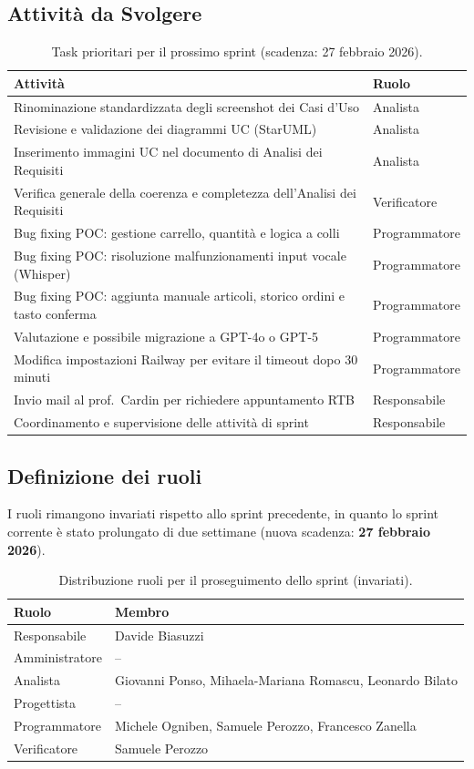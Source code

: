 \documentclass[a4paper, 11pt, oneside]{scrartcl}
\begin{document}
\subsection{Attività da Svolgere}
\begin{table}[h!]
\centering
\begin{tabular}{@{}p{9.2cm}l@{}}
\toprule
\textbf{Attività} & \textbf{Ruolo} \\
\midrule
Rinominazione standardizzata degli screenshot dei Casi d'Uso & Analista \\
Revisione e validazione dei diagrammi UC (StarUML) & Analista \\
Inserimento immagini UC nel documento di Analisi dei Requisiti & Analista \\
Verifica generale della coerenza e completezza dell'Analisi dei Requisiti & Verificatore \\
Bug fixing POC: gestione carrello, quantità e logica a colli & Programmatore \\
Bug fixing POC: risoluzione malfunzionamenti input vocale (Whisper) & Programmatore \\
Bug fixing POC: aggiunta manuale articoli, storico ordini e tasto conferma & Programmatore \\
Valutazione e possibile migrazione a GPT-4o o GPT-5 & Programmatore \\
Modifica impostazioni Railway per evitare il timeout dopo 30 minuti & Programmatore \\
Invio mail al prof.\ Cardin per richiedere appuntamento RTB & Responsabile \\
Coordinamento e supervisione delle attività di sprint & Responsabile \\
\bottomrule
\end{tabular}
\caption{Task prioritari per il prossimo sprint (scadenza: 27 febbraio 2026).}
\end{table}

\subsection{Definizione dei ruoli}
I ruoli rimangono invariati rispetto allo sprint precedente, in quanto lo sprint corrente è stato prolungato di due settimane (nuova scadenza: \textbf{27 febbraio 2026}).
\begin{table}[h!]
\centering
\begin{tabular}{@{}l l@{}}
\toprule
\textbf{Ruolo} & \textbf{Membro} \\
\midrule
Responsabile   & Davide Biasuzzi \\
Amministratore & -- \\
Analista       & Giovanni Ponso, Mihaela-Mariana Romascu, Leonardo Bilato \\
Progettista    & -- \\
Programmatore  & Michele Ogniben, Samuele Perozzo, Francesco Zanella \\
Verificatore   & Samuele Perozzo \\
\bottomrule
\end{tabular}
\caption{Distribuzione ruoli per il proseguimento dello sprint (invariati).}
\end{table}

\newpage
\end{document}
